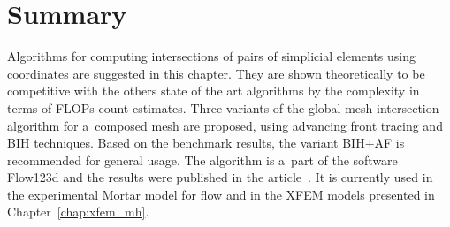 \section{Summary}
Algorithms for computing intersections of pairs of simplicial elements using \plucker coordinates are suggested in this chapter.
They are shown theoretically to be competitive with the others state of the art algorithms by the complexity in terms of FLOPs count estimates.
Three variants of the global mesh intersection algorithm for a~composed mesh are proposed, using 
advancing front tracing and BIH techniques. Based on the benchmark results, the variant BIH+AF is recommended for general usage.
The algorithm is a~part of the software Flow123d and the results were published in the article~\cite{brezina_2017}.
It is currently used in the experimental Mortar model for flow and in the XFEM models presented in Chapter~\ref{chap:xfem_mh}.

